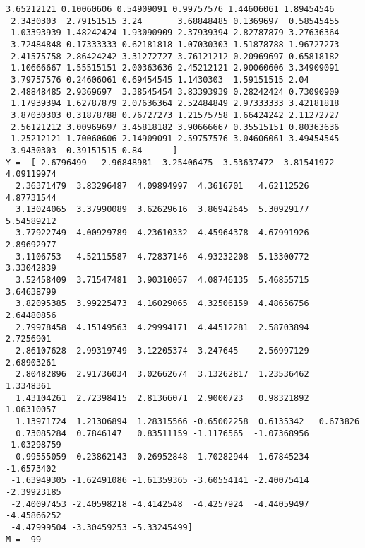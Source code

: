 \documentclass[11pt]{article}
\begin{document}
\begin{Verbatim}[commandchars=\\\{\}]
 3.65212121 0.10060606 0.54909091 0.99757576 1.44606061 1.89454546
 2.3430303  2.79151515 3.24       3.68848485 0.1369697  0.58545455
 1.03393939 1.48242424 1.93090909 2.37939394 2.82787879 3.27636364
 3.72484848 0.17333333 0.62181818 1.07030303 1.51878788 1.96727273
 2.41575758 2.86424242 3.31272727 3.76121212 0.20969697 0.65818182
 1.10666667 1.55515151 2.00363636 2.45212121 2.90060606 3.34909091
 3.79757576 0.24606061 0.69454545 1.1430303  1.59151515 2.04
 2.48848485 2.9369697  3.38545454 3.83393939 0.28242424 0.73090909
 1.17939394 1.62787879 2.07636364 2.52484849 2.97333333 3.42181818
 3.87030303 0.31878788 0.76727273 1.21575758 1.66424242 2.11272727
 2.56121212 3.00969697 3.45818182 3.90666667 0.35515151 0.80363636
 1.25212121 1.70060606 2.14909091 2.59757576 3.04606061 3.49454545
 3.9430303  0.39151515 0.84      ]
Y =  [ 2.6796499   2.96848981  3.25406475  3.53637472  3.81541972  4.09119974
  2.36371479  3.83296487  4.09894997  4.3616701   4.62112526  4.87731544
  3.13024065  3.37990089  3.62629616  3.86942645  5.30929177  5.54589212
  3.77922749  4.00929789  4.23610332  4.45964378  4.67991926  2.89692977
  3.1106753   4.52115587  4.72837146  4.93232208  5.13300772  3.33042839
  3.52458409  3.71547481  3.90310057  4.08746135  5.46855715  3.64638799
  3.82095385  3.99225473  4.16029065  4.32506159  4.48656756  2.64480856
  2.79978458  4.15149563  4.29994171  4.44512281  2.58703894  2.7256901
  2.86107628  2.99319749  3.12205374  3.247645    2.56997129  2.68903261
  2.80482896  2.91736034  3.02662674  3.13262817  1.23536462  1.3348361
  1.43104261  2.72398415  2.81366071  2.9000723   0.98321892  1.06310057
  1.13971724  1.21306894  1.28315566 -0.65002258  0.6135342   0.673826
  0.73085284  0.7846147   0.83511159 -1.1176565  -1.07368956 -1.03298759
 -0.99555059  0.23862143  0.26952848 -1.70282944 -1.67845234 -1.6573402
 -1.63949305 -1.62491086 -1.61359365 -3.60554141 -2.40075414 -2.39923185
 -2.40097453 -2.40598218 -4.4142548  -4.4257924  -4.44059497 -4.45866252
 -4.47999504 -3.30459253 -5.33245499]
M =  99
    \end{Verbatim}
\end{document}
